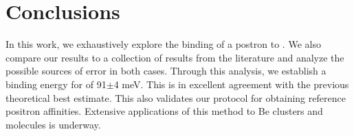 \section{Conclusions}
In this work, we exhaustively explore the binding of a postron to .
We also compare our results to a collection of results from the literature and analyze the possible sources of error in both cases.
Through this analysis, we establish a binding energy for  of 91$\pm$4 meV.
This is in excellent agreement with the previous theoretical best estimate.
This also validates our protocol for obtaining reference positron affinities.
Extensive applications of this method to Be clusters and molecules is underway.
